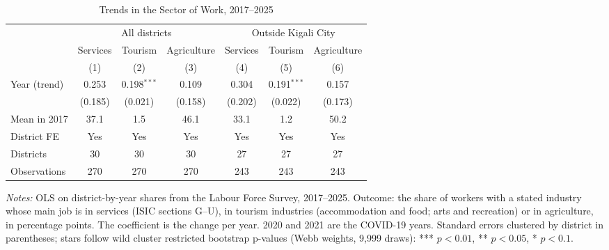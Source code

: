 \documentclass[11pt]{article}
\begin{document}
\begin{table}[H]
\centering\footnotesize\setlength{\tabcolsep}{4pt}
\caption{Trends in the Sector of Work, 2017--2025}
\label{tab:mt_trend}
\begin{adjustbox}{max width=\textwidth, max totalheight=0.8\textheight}
\begin{tabular}{lcccccc}
\toprule
 & \multicolumn{3}{c}{All districts} & \multicolumn{3}{c}{Outside Kigali City} \\
\cmidrule(lr){2-4}\cmidrule(lr){5-7}
 & Services & Tourism & Agriculture & Services & Tourism & Agriculture \\
 & (1) & (2) & (3) & (4) & (5) & (6) \\
\midrule
Year (trend) & 0.253 & 0.198$^{***}$ & 0.109 & 0.304 & 0.191$^{***}$ & 0.157 \\
 & (0.185) & (0.021) & (0.158) & (0.202) & (0.022) & (0.173) \\
\midrule
Mean in 2017 & 37.1 & 1.5 & 46.1 & 33.1 & 1.2 & 50.2 \\
District FE & Yes & Yes & Yes & Yes & Yes & Yes \\
Districts & 30 & 30 & 30 & 27 & 27 & 27 \\
Observations & 270 & 270 & 270 & 243 & 243 & 243 \\
\bottomrule
\end{tabular}
\end{adjustbox}
\begin{minipage}{0.97\textwidth}\scriptsize
\textit{Notes:} OLS on district-by-year shares from the Labour Force Survey, 2017--2025. Outcome: the share of workers with a stated industry whose main job is in services (ISIC sections G--U), in tourism industries (accommodation and food; arts and recreation) or in agriculture, in percentage points. The coefficient is the change per year. 2020 and 2021 are the COVID-19 years. Standard errors clustered by district in parentheses; stars follow wild cluster restricted bootstrap p-values (Webb weights, 9,999 draws): *** $p<0.01$, ** $p<0.05$, * $p<0.1$.
\end{minipage}
\end{table}
\clearpage
\end{document}
